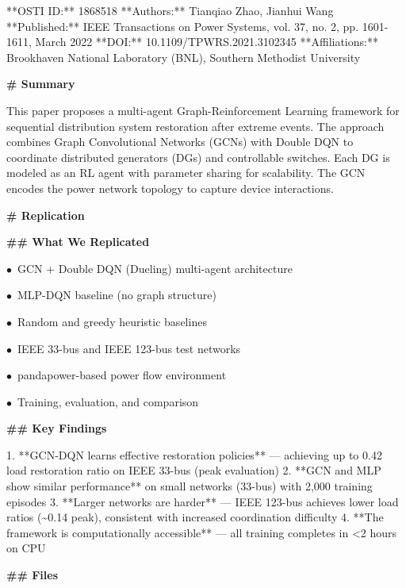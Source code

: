 \documentclass[11pt]{article}
\begin{document}
**OSTI ID:** 1868518  
**Authors:** Tianqiao Zhao, Jianhui Wang  
**Published:** IEEE Transactions on Power Systems, vol. 37, no. 2, pp. 1601-1611, March 2022  
**DOI:** 10.1109/TPWRS.2021.3102345  
**Affiliations:** Brookhaven National Laboratory (BNL), Southern Methodist University

\par\medskip\textbf{\# Summary}\par

This paper proposes a multi-agent Graph-Reinforcement Learning framework for sequential distribution system restoration after extreme events. The approach combines Graph Convolutional Networks (GCNs) with Double DQN to coordinate distributed generators (DGs) and controllable switches. Each DG is modeled as an RL agent with parameter sharing for scalability. The GCN encodes the power network topology to capture device interactions.

\par\medskip\textbf{\# Replication}\par

\par\medskip\textbf{\#\# What We Replicated}\par
\par$\bullet$\ GCN + Double DQN (Dueling) multi-agent architecture
\par$\bullet$\ MLP-DQN baseline (no graph structure)  
\par$\bullet$\ Random and greedy heuristic baselines
\par$\bullet$\ IEEE 33-bus and IEEE 123-bus test networks
\par$\bullet$\ pandapower-based power flow environment
\par$\bullet$\ Training, evaluation, and comparison

\par\medskip\textbf{\#\# Key Findings}\par
1. **GCN-DQN learns effective restoration policies** — achieving up to 0.42 load restoration ratio on IEEE 33-bus (peak evaluation)
2. **GCN and MLP show similar performance** on small networks (33-bus) with 2,000 training episodes
3. **Larger networks are harder** — IEEE 123-bus achieves lower load ratios (\textasciitilde{}0.14 peak), consistent with increased coordination difficulty
4. **The framework is computationally accessible** — all training completes in \textless{}2 hours on CPU

\par\medskip\textbf{\#\# Files}\par
[code block omitted]
\end{document}

